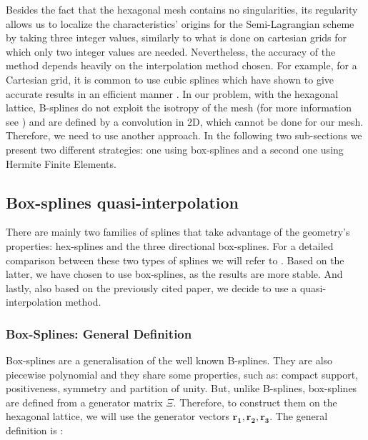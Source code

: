 \documentclass[proc]{edpsmath}
\begin{document}
Besides the fact that the hexagonal mesh contains no singularities, its regularity allows us to localize the characteristics' origins for the Semi-Lagrangian scheme by taking three integer values, similarly to what is done on cartesian grids for which only two integer values are needed. Nevertheless, the accuracy of the method depends heavily on the interpolation method chosen. For example, for a Cartesian grid, it is common to use cubic splines which have shown to give accurate results in an efficient manner \cite{Sonnendrucker1999201}. In our problem, with the hexagonal lattice, B-splines do not exploit the isotropy of the mesh (for more information see \cite{Mersereau79-IEEE}) and are defined by a convolution in 2D, which cannot be done for our mesh. Therefore, we need to use another approach. In the following two sub-sections we present two different strategies: one using box-splines and a second one using Hermite Finite Elements.


\subsection{Box-splines quasi-interpolation}

There are mainly two families of  splines that take advantage of the geometry's properties: hex-splines and the three directional box-splines. For a detailed comparison between these two types of splines we will refer to \cite{Condat2007}. Based on the latter, we have chosen to use box-splines, as the results are more stable. And lastly, also based on the previously cited paper, we decide to use a quasi-interpolation method.

\subsubsection{Box-Splines: General Definition}

Box-splines are a generalisation of the well known B-splines. They are also piecewise polynomial and they share some properties, such as: compact support, positiveness, symmetry and partition of unity. But, unlike B-splines, box-splines are defined from a generator matrix $\Xi$. Therefore, to construct them on the hexagonal lattice, we will use the generator vectors $\mathbf{r_1, r_2, r_3}$. The general definition is \cite{Boor1993, Condat2006}:
\end{document}
